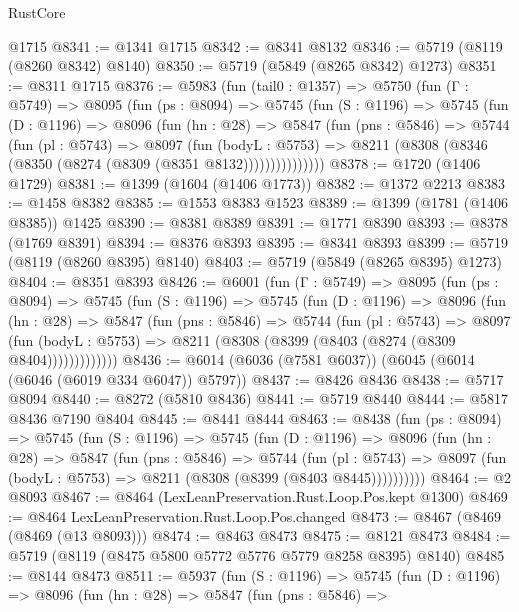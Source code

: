 \begin{lexlean}{RustCore}
\begin{coremodule}
    @1715
@8341 := @1341 @1715
@8342 := @8341 @8132
@8346 := @5719 (@8119 (@8260 @8342) @8140)
@8350 := @5719 (@5849 (@8265 @8342) @1273)
@8351 := @8311 @1715
@8376 := @5983
    (fun (tail0 : @1357) =>
    @5750
      (fun (Γ : @5749) =>
      @8095
        (fun (ps : @8094) =>
        @5745
          (fun (S : @1196) =>
          @5745
            (fun (D : @1196) =>
            @8096
              (fun (hn : @28) =>
              @5847
                (fun (pns : @5846) =>
                @5744
                  (fun (pl : @5743) =>
                  @8097
                    (fun (bodyL : @5753) =>
                    @8211 (@8308 (@8346 (@8350 (@8274 (@8309 (@8351 @8132)))))))))))))))
@8378 := @1720 (@1406 @1729)
@8381 := @1399 (@1604 (@1406 @1773))
@8382 := @1372 @2213
@8383 := @1458 @8382
@8385 := @1553 @8383 @1523
@8389 := @1399 (@1781 (@1406 @8385)) @1425
@8390 := @8381 @8389
@8391 := @1771 @8390
@8393 := @8378 (@1769 @8391)
@8394 := @8376 @8393
@8395 := @8341 @8393
@8399 := @5719 (@8119 (@8260 @8395) @8140)
@8403 := @5719 (@5849 (@8265 @8395) @1273)
@8404 := @8351 @8393
@8426 := @6001
    (fun (Γ : @5749) =>
    @8095
      (fun (ps : @8094) =>
      @5745
        (fun (S : @1196) =>
        @5745
          (fun (D : @1196) =>
          @8096
            (fun (hn : @28) =>
            @5847
              (fun (pns : @5846) =>
              @5744
                (fun (pl : @5743) =>
                @8097
                  (fun (bodyL : @5753) =>
                  @8211 (@8308 (@8399 (@8403 (@8274 (@8309 @8404)))))))))))))
@8436 := @6014 (@6036 (@7581 @6037)) (@6045 (@6014 (@6046 (@6019 @334 @6047)) @5797))
@8437 := @8426 @8436
@8438 := @5717 @8094
@8440 := @8272 (@5810 @8436)
@8441 := @5719 @8440
@8444 := @5817 @8436 @7190 @8404
@8445 := @8441 @8444
@8463 := @8438
    (fun (ps : @8094) =>
    @5745
      (fun (S : @1196) =>
      @5745
        (fun (D : @1196) =>
        @8096
          (fun (hn : @28) =>
          @5847
            (fun (pns : @5846) =>
            @5744
              (fun (pl : @5743) =>
              @8097 (fun (bodyL : @5753) => @8211 (@8308 (@8399 (@8403 @8445))))))))))
@8464 := @2 @8093
@8467 := @8464 (LexLeanPreservation.Rust.Loop.Pos.kept @1300)
@8469 := @8464 LexLeanPreservation.Rust.Loop.Pos.changed
@8473 := @8467 (@8469 (@8469 (@13 @8093)))
@8474 := @8463 @8473
@8475 := @8121 @8473
@8484 := @5719 (@8119 (@8475 @5800 @5772 @5776 @5779 @8258 @8395) @8140)
@8485 := @8144 @8473
@8511 := @5937
    (fun (S : @1196) =>
    @5745
      (fun (D : @1196) =>
      @8096
        (fun (hn : @28) =>
        @5847
          (fun (pns : @5846) =>

\end{coremodule}
\end{lexlean}
